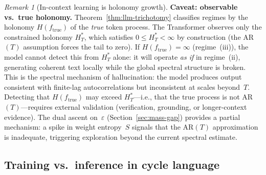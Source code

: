 \documentclass[11pt,a4paper]{article}
\theoremstyle{definition}
\theoremstyle{remark}
\newtheorem{remark}[theorem]{Remark}
\begin{document}
\begin{remark}[In-context learning is holonomy growth]
\medskip\noindent\textbf{Caveat: observable vs.\ true holonomy.}
Theorem~\ref{thm:llm-trichotomy} classifies regimes by the
holonomy $H(f_{\mathrm{true}})$ of the \emph{true} token process.
The Transformer observes only the constrained holonomy $H_T^*$,
which satisfies $0 \leq H_T^* < \infty$ by construction (the
AR$(T)$ assumption forces the tail to zero).
If $H(f_{\mathrm{true}}) = \infty$ (regime~(iii)), the model
cannot detect this from $H_T^*$ alone: it will operate \emph{as
if} in regime~(ii), generating coherent text locally while the
global spectral structure is broken.
This is the spectral mechanism of hallucination: the model
produces output consistent with finite-lag autocorrelations but
inconsistent at scales beyond~$T$.
Detecting that $H(f_{\mathrm{true}})$ may exceed
$H_T^*$---i.e., that the true process is not AR$(T)$---requires
external validation (verification, grounding, or longer-context
evidence).
The dual ascent on~$\varepsilon$
(Section~\ref{sec:mass-gap}) provides a partial mechanism:
a spike in weight entropy~$S$ signals that the AR$(T)$
approximation is inadequate, triggering exploration beyond the
current spectral estimate.
\end{remark}

\subsection*{Training vs.\ inference in cycle language}
\end{document}
